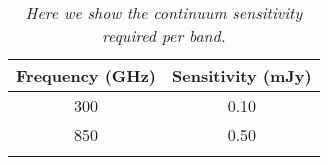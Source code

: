 \documentclass[12pt,a4paper]{article}  %
\begin{document}
%
%
 

%




\begin{table}[tbh]
\begin{center}
\caption[]{\em{Here we show the continuum sensitivity required per band.}}
\begin{tabular}{cc}
\hline \noalign {\smallskip}
Frequency (GHz) & Sensitivity (mJy) \\
\hline \noalign {\smallskip}
300 & 0.10 \\
850 & 0.50 \\
\hline \noalign {\smallskip}
\end{tabular}
\end{center}
\end{table}
\end{document}
